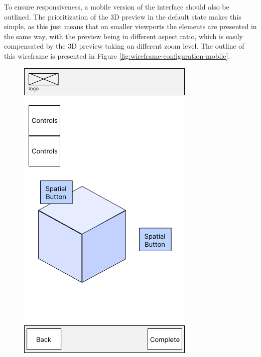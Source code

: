To ensure responsiveness, a mobile version of the interface should also be outlined. The prioritization of the 3D preview in the default state makes this simple, as this just means that on smaller viewports the elements are presented in the same way, with the preview being in different aspect ratio, which is easily compensated by the 3D preview taking on different zoom level. The outline of this wireframe is presented in Figure \ref{fig:wireframe-configuration-mobile}.

\begin{figure}[h]
    \centering
    \begin{minipage}{0.4\textwidth}
        \centering
        \includegraphics[width=\linewidth]{images/wireframe_configuration_mobile_default.png}

\end{minipage}
\end{figure}
